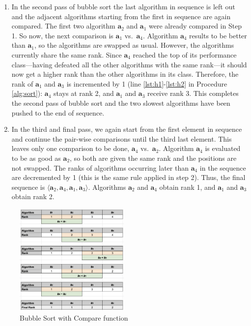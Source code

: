 \documentclass[conference]{IEEEtran}
\begin{document}
\begin{enumerate}
	\item
          In the second pass of bubble sort the last algorithm in sequence is left out and the adjacent algorithms
          starting from the first in sequence are again compared. The first two algorithm $\mathbf{a}_2$ and
          $\mathbf{a}_1$ were already compared in Step 1. So now, the next comparison is $\mathbf{a}_1$ vs.~$\mathbf{a}_4$.
          Algorithm $\mathbf{a}_4$ results to be better than $\mathbf{a}_1$, so the algorithms are swapped as usual. However, the
          algorithms currently share the same rank. Since $\mathbf{a}_4$ reached the top of its performance
          class---having defeated all the other algorithms with the same rank---it should now get a higher rank than the
          other algorithms in its class. Therefore, the rank of $\mathbf{a}_1$ and $\mathbf{a}_3$ is incremented by 1
          (line \ref{lst:h1}-\ref{lst:h2} in Procedure \ref{alg:sort}): $\mathbf{a}_4$ stays at rank 2, and $\mathbf{a}_1$ and $\mathbf{a}_3$ receive rank 3. This completes the second pass of bubble sort and the two slowest algorithms have been pushed to the end of sequence.
	
	\item
          In the third and final pass,
          we again start from the first element in sequence and continue the pair-wise comparisons until the third last
          element. This leaves only one comparison to be done, $\mathbf{a}_4$ vs.~$\mathbf{a}_2$.
          Algorithm $\mathbf{a}_4$ is evaluated to be as good as $\mathbf{a}_2$, so both are given the same rank and the positions are not swapped. The ranks of algorithms occurring later than $\mathbf{a}_4$ in the sequence are decremented by 1 (this is the same rule applied in step 2). Thus,
          the final sequence is $\langle \mathbf{a}_2, \mathbf{a}_4, \mathbf{a}_1, \mathbf{a}_3 \rangle$. Algorithms $\mathbf{a}_2$ and $\mathbf{a}_4$ obtain rank 1, and $\mathbf{a}_1$ and $\mathbf{a}_3$ obtain rank 2.
\end{enumerate}

\begin{figure}
	\includegraphics[width=0.5\textwidth]{fig/ranking}
	\caption{Bubble Sort with Compare function}
	\label{fig:sort}
\end{figure}
\end{document}

